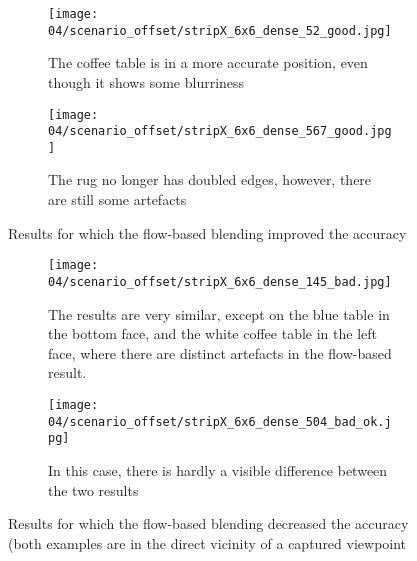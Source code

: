 \begin{figure}
\centering
    \hfill
    \begin{subfigure}[b]{\textwidth}
            \centering
            \texttt{[image: 04/scenario\_offset/stripX\_6x6\_dense\_52\_good.jpg]}
            \caption{The coffee table is in a more accurate position, even though it shows some blurriness}
    \end{subfigure}
    \hfill

    \hfill
    \begin{subfigure}[b]{\textwidth}
            \centering
            \texttt{[image: 04/scenario\_offset/stripX\_6x6\_dense\_567\_good.jpg]}
            \caption{The rug no longer has doubled edges, however, there are still some artefacts}
    \end{subfigure}
    \hfill
  \caption{Results for which the flow-based blending improved the accuracy} \label{fig:offset_good}
\end{figure}

\begin{figure}
\centering
    \hfill
    \begin{subfigure}[b]{\textwidth}
            \centering
            \texttt{[image: 04/scenario\_offset/stripX\_6x6\_dense\_145\_bad.jpg]}
            \caption{The results are very similar, except on the blue table in the bottom face, and the white coffee table in the left face, where there are distinct artefacts in the flow-based result.}
    \end{subfigure}
    \hfill

    \hfill
    \begin{subfigure}[b]{\textwidth}
            \centering
            \texttt{[image: 04/scenario\_offset/stripX\_6x6\_dense\_504\_bad\_ok.jpg]}
            \caption{In this case, there is hardly a visible difference between the two results}
    \end{subfigure}
    \hfill
  \caption{Results for which the flow-based blending decreased the accuracy (both examples are in the direct vicinity of a captured viewpoint} \label{fig:offset_bad}
\end{figure}
